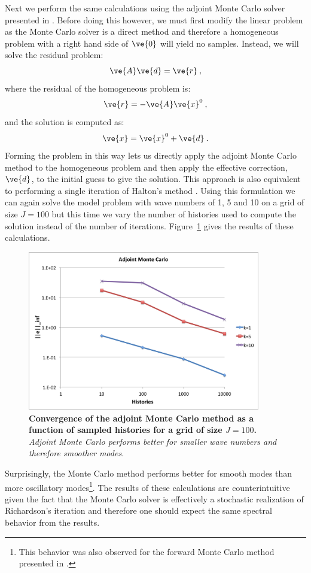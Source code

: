 \documentclass[note]{TechNote}
\begin{document}
Next we perform the same calculations using the adjoint Monte Carlo
solver presented in \cite{evans_monte_2012}. Before doing this
however, we must first modify the linear problem as the Monte Carlo
solver is a direct method and therefore a homogeneous problem with a
right hand side of $\ve{0}$ will yield no samples. Instead, we will
solve the residual problem:
\begin{equation}
  \ve{A}\ve{d} = \ve{r}\:,
  \label{eq:residual_problem}
\end{equation}
where the residual of the homogeneous problem is:
\begin{equation}
  \ve{r} = -\ve{A}\ve{x}^0\:,
  \label{eq:homogeneous_residual}
\end{equation}
and the solution is computed as:
\begin{equation}
  \ve{x} = \ve{x}^0 + \ve{d}\:.
  \label{eq:residual_solution}
\end{equation}
Forming the problem in this way lets us directly apply the adjoint
Monte Carlo method to the homogeneous problem and then apply the
effective correction, $\ve{d}$, to the initial guess to give the
solution. This approach is also equivalent to performing a single
iteration of Halton's method \cite{halton_sequential_1962}. Using this
formulation we can again solve the model problem with wave numbers of
1, 5 and 10 on a grid of size $J = 100$ but this time we vary the
number of histories used to compute the solution instead of the number
of iterations. Figure~\ref{fig:adjoint_mc} gives the results of these
calculations.
\begin{figure}[h!]
  \begin{center}
    \includegraphics[width=4in]{adjoint_mc.png}
  \end{center}
  \caption{\textbf{Convergence of the adjoint Monte Carlo method as a
      function of sampled histories for a grid of size $J = 100$.}
    \textit{Adjoint Monte Carlo performs better for smaller wave
      numbers and therefore smoother modes.}}
  \label{fig:adjoint_mc}
\end{figure}
Surprisingly, the Monte Carlo method performs better for smooth modes
than more oscillatory modes\footnote{This behavior was also observed
  for the forward Monte Carlo method presented in
  \cite{evans_monte_2012}.}. The results of these calculations are
counterintuitive given the fact that the Monte Carlo solver is
effectively a stochastic realization of Richardson's iteration and
therefore one should expect the same spectral behavior from the
results.
\end{document}
